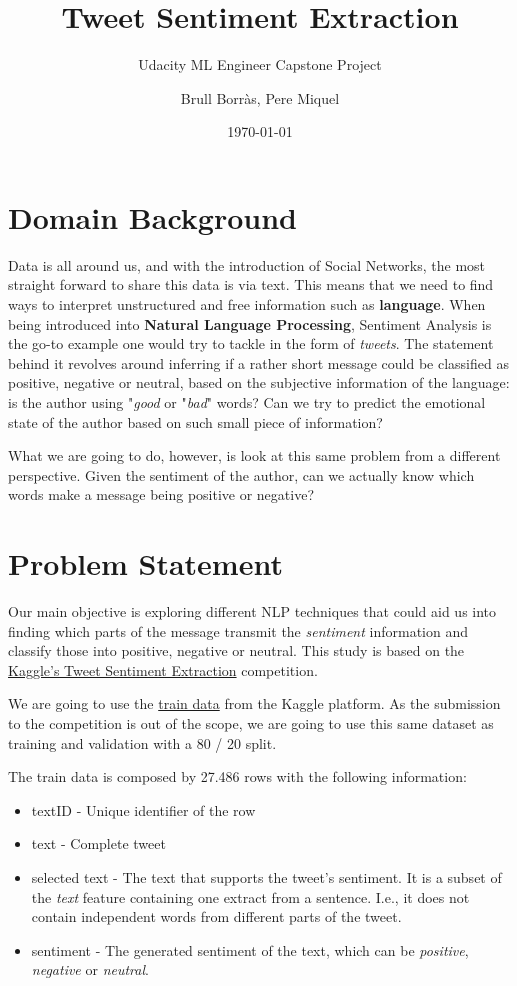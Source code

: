 \documentclass[11pt]{article}
\title{Tweet Sentiment Extraction}
\subtitle{Udacity ML Engineer Capstone Project}
\author{Brull Borràs, Pere Miquel}
\date{\today}
\begin{document}
\maketitle

\section{Domain Background}

Data is all around us, and with the introduction of Social Networks, the most straight forward to share this data is via text. This means that we need to find ways to interpret unstructured and free information such as \textbf{language}. When being introduced into \textbf{Natural Language Processing}, Sentiment Analysis is the go-to example one would try to tackle in the form of \textit{tweets}. The statement behind it revolves around inferring if a rather short message could be classified as positive, negative or neutral, based on the subjective information of the language: is the author using "\textit{good} or "\textit{bad}" words? Can we try to predict the emotional state of the author based on such small piece of information?

What we are going to do, however, is look at this same problem from a different perspective. Given the sentiment of the author, can we actually know which words make a message being positive or negative?

\section{Problem Statement}

Our main objective is exploring different NLP techniques that could aid us into finding which parts of the message transmit the \textit{sentiment} information and classify those into positive, negative or neutral. This study is based on the \href{https://www.kaggle.com/c/tweet-sentiment-extraction}{Kaggle's Tweet Sentiment Extraction} competition.

We are going to use the \href{https://www.kaggle.com/c/tweet-sentiment-extraction/data}{train data} from the Kaggle platform. As the submission to the competition is out of the scope, we are going to use this same dataset as training and validation with a 80 / 20 split.

The train data is composed by 27.486 rows with the following information:
\begin{itemize}
    \item textID - Unique identifier of the row
    \item text - Complete tweet
    \item selected text - The text that supports the tweet's sentiment. It is a subset of the \textit{text} feature containing one extract from a sentence. I.e., it does not contain independent words from different parts of the tweet.
    \item sentiment - The generated sentiment of the text, which can be \textit{positive}, \textit{negative} or \textit{neutral}.
\end{itemize}
\end{document}
